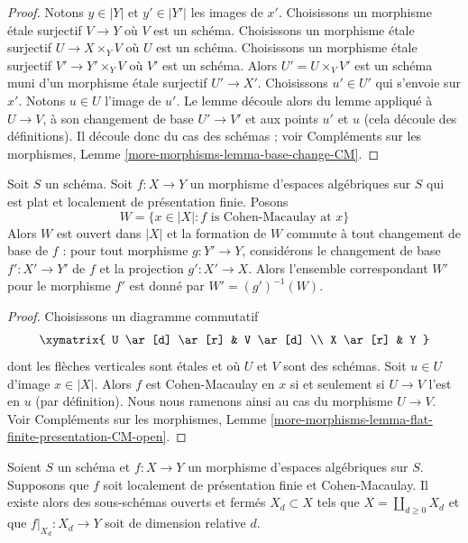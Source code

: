 \begin{proof}
Notons $y \in |Y|$ et $y' \in |Y'|$ les images de $x'$.
Choisissons un morphisme étale surjectif $V \to Y$ où $V$ est un schéma.
Choisissons un morphisme étale surjectif $U \to X \times_Y V$ où
$U$ est un schéma.
Choisissons un morphisme étale surjectif $V' \to Y' \times_Y V$
où $V'$ est un schéma.
Alors $U' = U \times_V V'$ est un schéma muni
d'un morphisme étale surjectif $U' \to X'$.
Choisissons $u' \in U'$ qui s'envoie sur $x'$. Notons $u \in U$ l'image de $u'$.
Le lemme découle alors du lemme appliqué à
$U \to V$, à son changement de base $U' \to V'$ et aux
points $u'$ et $u$ (cela découle des définitions).
Il découle donc du cas des schémas ; voir
Compléments sur les morphismes, Lemme \ref{more-morphisms-lemma-base-change-CM}.
\end{proof}

\begin{lemma}
\label{lemma-flat-finite-presentation-CM-open}
Soit $S$ un schéma.
Soit $f : X \to Y$ un morphisme d'espaces algébriques sur $S$
qui est plat et localement de présentation finie. Posons
$$
W = \{x \in |X| : f\text{ is Cohen-Macaulay at }x\}
$$
Alors $W$ est ouvert dans $|X|$ et la formation de $W$
commute à tout changement de base de $f$ :
pour tout morphisme $g : Y' \to Y$, considérons
le changement de base $f' : X' \to Y'$ de $f$ et la
projection $g' : X' \to X$. Alors l'ensemble correspondant
$W'$ pour le morphisme $f'$ est donné par $W' = (g')^{-1}(W)$.
\end{lemma}

\begin{proof}
Choisissons un diagramme commutatif
$$
\xymatrix{
U \ar[d] \ar[r] & V \ar[d] \\
X \ar[r] & Y
}
$$
dont les flèches verticales sont étales et où $U$ et $V$ sont des schémas.
Soit $u \in U$ d'image $x \in |X|$.
Alors $f$ est Cohen-Macaulay en $x$ si et seulement si $U \to V$ l'est
en $u$ (par définition).
Nous nous ramenons ainsi au cas du morphisme $U \to V$.
Voir Compléments sur les morphismes, Lemme
\ref{more-morphisms-lemma-flat-finite-presentation-CM-open}.
\end{proof}

\begin{lemma}
\label{lemma-lfp-CM-relative-dimension}
Soient $S$ un schéma et $f : X \to Y$ un
morphisme d'espaces algébriques sur $S$. Supposons que
$f$ soit localement de présentation finie et Cohen-Macaulay.
Il existe alors des sous-schémas ouverts et fermés $X_d \subset X$
tels que $X = \coprod_{d \geq 0} X_d$ et que $f|_{X_d} : X_d \to Y$
soit de dimension relative $d$.
\end{lemma}

